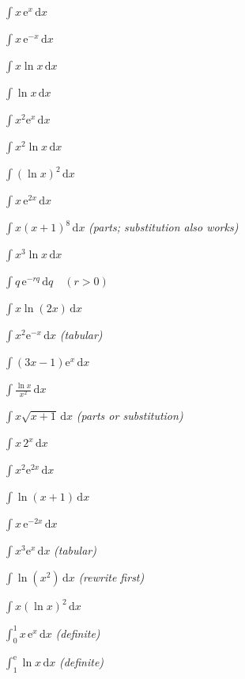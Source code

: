 \begin{problems}
  \item $\displaystyle\int x\,\mathrm{e}^{x}\,\mathrm{d}x$
  \item $\displaystyle\int x\,\mathrm{e}^{-x}\,\mathrm{d}x$
  \item $\displaystyle\int x\ln x\,\mathrm{d}x$
  \item $\displaystyle\int \ln x\,\mathrm{d}x$
  \item $\displaystyle\int x^{2}\mathrm{e}^{x}\,\mathrm{d}x$
  \item $\displaystyle\int x^{2}\ln x\,\mathrm{d}x$
  \item $\displaystyle\int (\ln x)^{2}\,\mathrm{d}x$
  \item $\displaystyle\int x\,\mathrm{e}^{2x}\,\mathrm{d}x$
  \item $\displaystyle\int x(x+1)^{8}\,\mathrm{d}x$
        \quad \emph{(parts; substitution also works)}
  \item $\displaystyle\int x^{3}\ln x\,\mathrm{d}x$
  \item $\displaystyle\int q\,\mathrm{e}^{-rq}\,\mathrm{d}q \quad (r>0)$
  \item $\displaystyle\int x\ln(2x)\,\mathrm{d}x$
  \item $\displaystyle\int x^{2}\mathrm{e}^{-x}\,\mathrm{d}x$
        \quad \emph{(tabular)}
  \item $\displaystyle\int (3x-1)\mathrm{e}^{x}\,\mathrm{d}x$
  \item $\displaystyle\int \frac{\ln x}{x^{2}}\,\mathrm{d}x$
  \item $\displaystyle\int x\sqrt{x+1}\,\mathrm{d}x$
        \quad \emph{(parts or substitution)}
  \item $\displaystyle\int x\,2^{x}\,\mathrm{d}x$
  \item $\displaystyle\int x^{2}\mathrm{e}^{2x}\,\mathrm{d}x$
  \item $\displaystyle\int \ln(x+1)\,\mathrm{d}x$
  \item $\displaystyle\int x\,\mathrm{e}^{-2x}\,\mathrm{d}x$
  \item $\displaystyle\int x^{3}\mathrm{e}^{x}\,\mathrm{d}x$
        \quad \emph{(tabular)}
  \item $\displaystyle\int \ln(x^{2})\,\mathrm{d}x$
        \quad \emph{(rewrite first)}
  \item $\displaystyle\int x(\ln x)^{2}\,\mathrm{d}x$
  \item $\displaystyle\int_{0}^{1} x\,\mathrm{e}^{x}\,\mathrm{d}x$
        \quad \emph{(definite)}
  \item $\displaystyle\int_{1}^{\mathrm{e}} \ln x\,\mathrm{d}x$
        \quad \emph{(definite)}
\end{problems}

